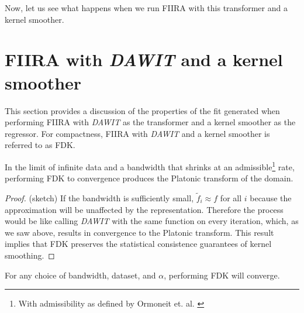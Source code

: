 Now, let us see what happens when we run FIIRA with this transformer and
a kernel smoother.

\section{FIIRA with \textit{DAWIT} and a kernel smoother}
This section provides a discussion of the properties of the fit
generated when performing FIIRA with \textit{DAWIT} as the transformer and
a kernel smoother as the regressor.
For compactness, FIIRA with \textit{DAWIT} and a kernel smoother is referred
to as FDK.

\begin{claim} In the limit of infinite data and a bandwidth that shrinks at an
admissible\footnote{With admissibility as defined by Ormoneit et. al.
\cite{kbrl}} rate,
performing FDK to convergence produces the Platonic transform of the domain.
\end{claim}
\begin{proof} (sketch) If the bandwidth is sufficiently small,
$\tilde f_i \approx f$ for all $i$ because the approximation will be unaffected
by the representation.
Therefore the process would be like calling \textit{DAWIT} with the same
function on every iteration, which, as we saw above, results in convergence
to the Platonic transform.
This result implies that FDK preserves the statistical consistence
guarantees of kernel smoothing.
\end{proof}

\begin{claim} For any choice of bandwidth, dataset, and $\alpha$, performing
FDK will converge.
\end{claim}

